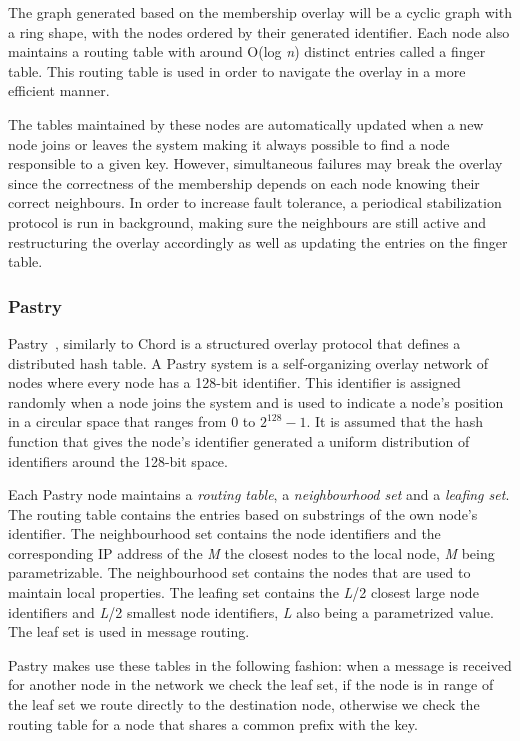 The graph generated based on the membership overlay will be a cyclic graph with
a ring shape, with the nodes ordered by their generated identifier. Each node
also maintains a routing table with around O(log \textit{n}) distinct entries
called a finger table. This routing table is used in order to navigate the overlay
in a more efficient manner.

The tables maintained by these nodes are automatically updated when a new node joins
or leaves the system  making it always possible to find a node responsible to a given
key. However, simultaneous failures may break the overlay since the correctness
of the membership depends on each node knowing their correct neighbours. In order
to increase fault tolerance, a periodical stabilization protocol is run in background,
making sure the neighbours are still active and restructuring the overlay
accordingly as well as updating the entries on the finger table.

\subsubsection{Pastry}\label{subsec:pastry}

Pastry~\cite{pastry}, similarly to Chord is a structured overlay protocol that
defines a distributed hash table. A Pastry system is a self-organizing overlay
network of nodes where every node has a 128-bit identifier. This identifier
is assigned randomly when a node joins the system and is used to indicate a
node's position in a circular space that ranges from 0 to $2^{128}-1$. It is assumed
that the hash function that gives the node's identifier generated a uniform
distribution of identifiers around the 128-bit space.

Each Pastry node maintains a \textit{routing table}, a \textit{neighbourhood set}
and a \textit{leafing set}. The routing table contains the entries based
on substrings of the own node's identifier. The neighbourhood set contains
the node identifiers and the corresponding IP address of the \textit{M} the closest
nodes to the local node, \textit{M} being parametrizable.  The neighbourhood
set contains the nodes that are used to maintain local properties. The leafing
set contains the \textit{L}/2 closest large node identifiers and \textit{L}/2
smallest node identifiers, \textit{L} also being a parametrized value. The
leaf set is used in message routing.

Pastry makes use these tables in the following fashion: when a message is received
for another node in the network we check the leaf set, if the node is in range of
the leaf set we route directly to the destination node, otherwise we check
the routing table for a node that shares a common prefix with the key.

